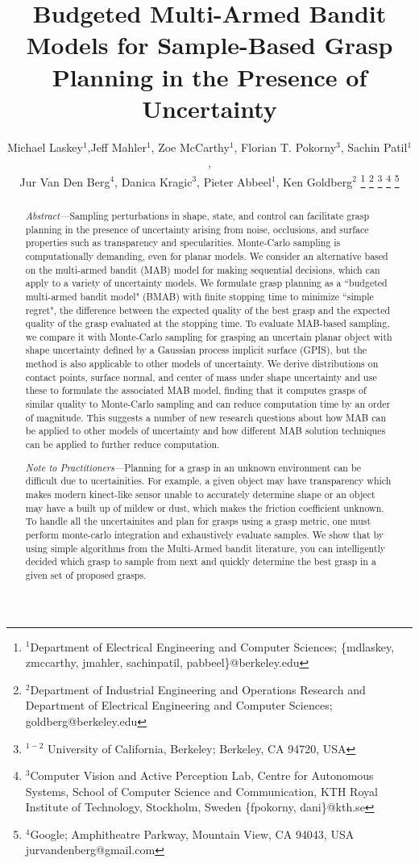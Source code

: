 \documentclass[journal,transmag]{IEEEtran}%
\title{\LARGE \bf
Budgeted Multi-Armed Bandit Models for Sample-Based Grasp Planning in the Presence of Uncertainty}
\author{Michael Laskey$^1$,Jeff Mahler$^1$, Zoe McCarthy$^1$,  Florian T. Pokorny$^3$, Sachin Patil$^1$,\\ Jur Van Den Berg$^4$,  Danica Kragic$^3$, Pieter Abbeel$^1$, Ken Goldberg$^2$%
\thanks{$^1$Department of Electrical Engineering and Computer Sciences; {\small \{mdlaskey, zmccarthy, jmahler, sachinpatil, pabbeel\}@berkeley.edu}}%
\thanks{$^2$Department of Industrial Engineering and Operations Research and Department of Electrical Engineering and Computer Sciences; {\small goldberg@berkeley.edu}}%
\thanks{$^{1-2}$ University of California, Berkeley;  Berkeley, CA 94720, USA}%
\thanks{$^3$Computer Vision and Active Perception Lab, Centre for Autonomous Systems, School of Computer Science and Communication, KTH Royal Institute of Technology, Stockholm, Sweden {\small \{fpokorny, dani\}@kth.se}}%
\thanks{$^4$Google; Amphitheatre Parkway, Mountain View, CA 94043, USA {\small jurvandenberg@gmail.com}}%
}
\begin{document}
\maketitle
\thispagestyle{empty}
\pagestyle{empty}



\begin{abstract}
\textit{Abstract---}Sampling perturbations in shape, state, and control can facilitate grasp planning in the presence of uncertainty arising from noise, occlusions, and surface properties such as transparency and specularities.  Monte-Carlo sampling is computationally demanding, even for planar models. We consider an alternative based on the multi-armed bandit (MAB) model for making sequential decisions, which can apply to a variety of uncertainty models.  We formulate grasp planning as a ``budgeted multi-armed bandit model" (BMAB) with finite stopping time to minimize ``simple regret", the difference between the expected quality of the best grasp and the expected quality of the grasp evaluated at the stopping time.  To evaluate MAB-based sampling, we compare it with Monte-Carlo sampling for grasping an uncertain planar object with shape uncertainty defined by a Gaussian process implicit surface (GPIS), but the method is also applicable to other models of uncertainty.  We derive distributions on contact points, surface normal, and center of mass under shape uncertainty and use these to formulate the associated MAB model, finding that it computes grasps of similar quality to Monte-Carlo sampling and can reduce computation time by an order of magnitude.  This suggests a number of new research questions about how MAB can be applied to other models of uncertainty and how different MAB solution techniques can be applied to further reduce computation.
\end{abstract}

\begin{abstract}
\textit{Note to Practitioners---}Planning for a grasp in an unknown environment can be difficult due to ucertainities. For example, a given object may have transparency which makes modern kinect-like sensor unable to accurately determine shape or an object may have a built up of mildew or dust, which makes the friction coefficient unknown. To handle all the uncertainites and plan for grasps using a grasp metric, one must perform monte-carlo integration and exhaustively evaluate samples. We show that by using simple algorithms from the Multi-Armed bandit literature, you can intelligently decided which grasp to sample from next and quickly determine the best grasp in a given set of proposed grasps. 
\end{abstract}
\end{document}
